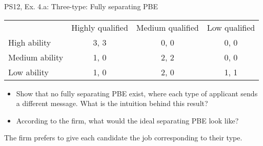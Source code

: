 \begin{frame}{PS12, Ex. 4.a: Three-type: Fully separating PBE}
    \begin{table}
      \begin{tabular}{l|c|c|c|}
          \multicolumn{1}{c}{} & \multicolumn{1}{c}{Highly qualified} & \multicolumn{1}{c}{Medium qualified} & \multicolumn{1}{c}{Low qualified} \\\cline{2-4}
          High ability   & 3, 3 & 0, 0 & 0, 0 \\\cline{2-4}
          Medium ability & 1, 0 & 2, 2 & 0, 0 \\\cline{2-4}
          Low ability    & 1, 0 & 2, 0 & 1, 1 \\\cline{2-4}
      \end{tabular}
    \end{table}\vspace{-8pt}
    \begin{itemize}
      \item[(a)] Show that no fully separating PBE exist, where each type of applicant sends a different message. What is the intuition behind this result?
      \item[Step 1:] According to the firm, what would the ideal separating PBE look like?
    \end{itemize}\vspace{-6pt}
    The firm prefers to give each candidate the job corresponding to their type.
    \vfill\null
\end{frame}
